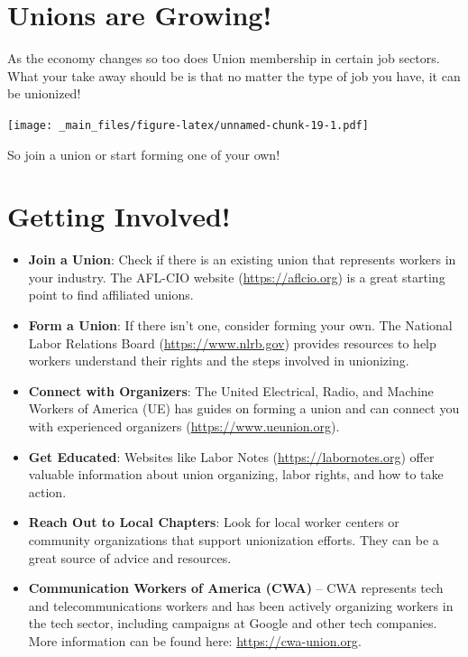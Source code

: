 \documentclass[
]{book}
\providecommand{\tightlist}{%
  \setlength{\itemsep}{0pt}\setlength{\parskip}{0pt}}
\theoremstyle{definition}
\theoremstyle{definition}
\theoremstyle{definition}
\theoremstyle{definition}
\theoremstyle{remark}
\begin{document}
\section{Unions are Growing!}\label{unions-are-growing}

As the economy changes so too does Union membership in certain job sectors. What your take away should be is that no matter the type of job you have, it can be unionized!

\texttt{[image: \_main\_files/figure-latex/unnamed-chunk-19-1.pdf]}

So join a union or start forming one of your own!

\section{Getting Involved!}\label{getting-involved}

\begin{itemize}
\tightlist
\item
  \textbf{Join a Union}: Check if there is an existing union that represents workers in your industry. The AFL-CIO website (\url{https://aflcio.org}) is a great starting point to find affiliated unions.
\item
  \textbf{Form a Union}: If there isn't one, consider forming your own. The National Labor Relations Board (\url{https://www.nlrb.gov}) provides resources to help workers understand their rights and the steps involved in unionizing.
\item
  \textbf{Connect with Organizers}: The United Electrical, Radio, and Machine Workers of America (UE) has guides on forming a union and can connect you with experienced organizers (\url{https://www.ueunion.org}).
\item
  \textbf{Get Educated}: Websites like Labor Notes (\url{https://labornotes.org}) offer valuable information about union organizing, labor rights, and how to take action.
\item
  \textbf{Reach Out to Local Chapters}: Look for local worker centers or community organizations that support unionization efforts. They can be a great source of advice and resources.
\item
  \textbf{Communication Workers of America (CWA)} -- CWA represents tech and telecommunications workers and has been actively organizing workers in the tech sector, including campaigns at Google and other tech companies. More information can be found here: \url{https://cwa-union.org}.
\end{itemize}

  
\end{document}
